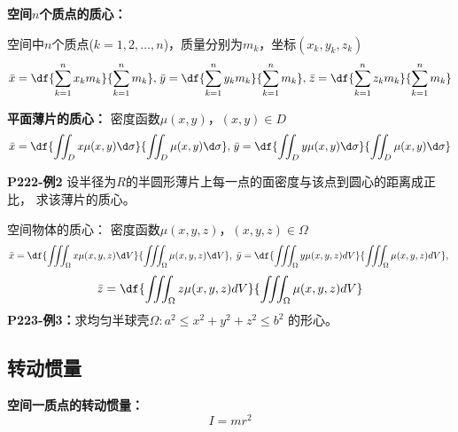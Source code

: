 {\bf 空间$n$个质点的质心：}
	
空间中$n$个质点($k=1,2,\ldots,n$)，质量分别为$m_k$，坐标$(x_k,y_k,z_k)$
$${\bar{x}=\df{\sum\limits_{k=1}^nx_km_k}{\sum\limits_{k=1}^nm_k},}\;
{\bar{y}=\df{\sum\limits_{k=1}^ny_km_k}{\sum\limits_{k=1}^nm_k},}\; 
{\bar{z}=\df{\sum\limits_{k=1}^nz_km_k}{\sum\limits_{k=1}^nm_k}}$$

{\bf 平面薄片的质心：} 密度函数$\mu(x,y)$，$(x,y)\in D$
$${\bar{x}=\df{\displaystyle\iint_Dx\mu(x,y)\d\sigma}
{\displaystyle\iint_D\mu(x,y)\d\sigma},\;} 
{\bar{y}=\df{\displaystyle\iint_Dy\mu(x,y)\d\sigma}
{\displaystyle\iint_D\mu(x,y)\d\sigma}}$$

{\bf P222-例2}
设半径为$R$的半圆形薄片上每一点的面密度与该点到圆心的距离成正比，
求该薄片的质心。

{\bb 空间物体的质心：} 密度函数$\mu(x,y,z)$，$(x,y,z)\in\Omega$
$$\bar{x}=\df{\displaystyle\iiint_{\Omega}x\mu(x,y,z)\d V}
{\displaystyle\iiint_{\Omega}\mu(x,y,z)\d V},\;
{\bar{y}=\df{\displaystyle\iiint_{\Omega}y\mu(x,y,z)dV}
{\displaystyle\iiint_{\Omega}\mu(x,y,z)dV},\;} $$
$${\bar{z}=\df{\displaystyle\iiint_{\Omega}z\mu(x,y,z)dV}
{\displaystyle\iiint_{\Omega}\mu(x,y,z)dV}}
$$
{\bf P223-例3：}求均匀半球壳$\Omega:a^2\leq x^2+y^2+z^2\leq b^2$
的形心。

\subsection{转动惯量}

{\bf 空间一质点的转动惯量：}$${I=mr^2}$$

\begin{center}
\end{center}

